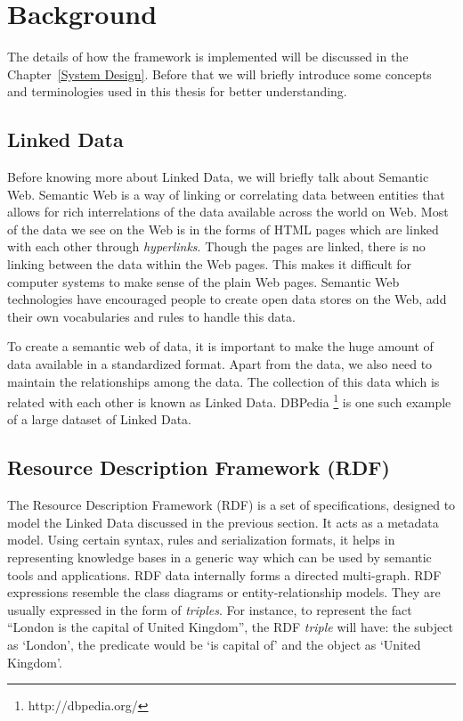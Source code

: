 \section{Background}
The details of how the framework is implemented will be discussed in the Chapter~\ref{System Design}. Before that we will briefly introduce some concepts and terminologies used in this thesis for better understanding.

\subsection{Linked Data}

Before knowing more about Linked Data, we will briefly talk about Semantic Web. Semantic Web is a way of linking or correlating data between entities that allows for rich interrelations of the data available across the world on Web. Most of the data we see on the Web is in the forms of HTML pages which are linked with each other through \textit{hyperlinks}. Though the pages are linked, there is no linking between the data within the Web pages. This makes it difficult for computer systems to make sense of the plain Web pages. Semantic Web technologies have encouraged people to create open data stores on the Web, add their own vocabularies and rules to handle this data.

To create a semantic web of data, it is important to make the huge amount of data available in a standardized format. Apart from the data, we also need to maintain the relationships among the data. The collection of this data which is related with each other is known as Linked Data. DBPedia \footnote{http://dbpedia.org/} is one such example of a large dataset of Linked Data.

\subsection{Resource Description Framework (RDF)}

The Resource Description Framework (RDF) is a set of specifications, designed to model the Linked Data discussed in the previous section. It acts as a metadata model. Using certain syntax, rules and serialization formats, it helps in representing knowledge bases in a generic way which can be used by semantic tools and applications. RDF data internally forms a directed multi-graph. RDF expressions resemble the class diagrams or entity-relationship models. They are usually expressed in the form of \textit{triples}. For instance, to represent the fact ``London is the capital of United Kingdom'', the RDF \textit{triple} will have: the subject as `London', the predicate would be `is capital of' and the object as `United Kingdom'.

